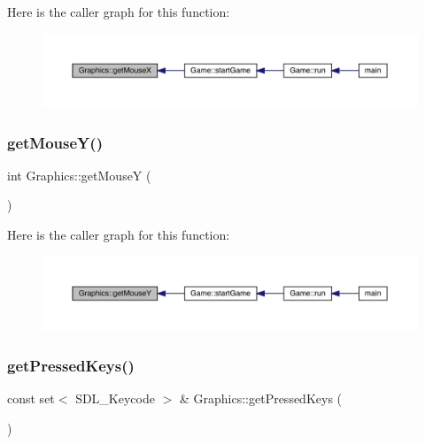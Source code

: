 Here is the caller graph for this function\+:\nopagebreak
\begin{figure}[H]
\begin{center}
\leavevmode
\includegraphics[width=350pt]{class_graphics_a48c86f4a3a87446fd8df707899e92d4f_icgraph}
\end{center}
\end{figure}
\mbox{\label{class_graphics_a4e21e1cfcd4523e86ddbc9c5d246de1e}} 
\subsubsection{\texorpdfstring{get\+Mouse\+Y()}{getMouseY()}}
{\footnotesize\ttfamily int Graphics\+::get\+MouseY (\begin{DoxyParamCaption}{ }\end{DoxyParamCaption})}

Here is the caller graph for this function\+:\nopagebreak
\begin{figure}[H]
\begin{center}
\leavevmode
\includegraphics[width=350pt]{class_graphics_a4e21e1cfcd4523e86ddbc9c5d246de1e_icgraph}
\end{center}
\end{figure}
\mbox{\label{class_graphics_a772ed930cc5ae22dcdc35b4094bffbce}} 
\subsubsection{\texorpdfstring{get\+Pressed\+Keys()}{getPressedKeys()}}
{\footnotesize\ttfamily const set$<$ S\+D\+L\+\_\+\+Keycode $>$ \& Graphics\+::get\+Pressed\+Keys (\begin{DoxyParamCaption}{ }\end{DoxyParamCaption})}


